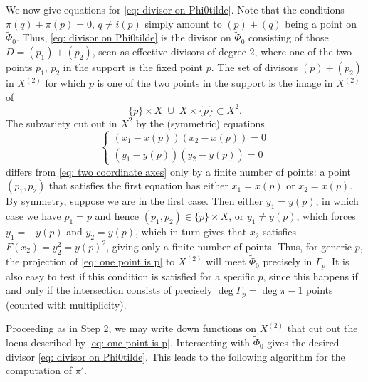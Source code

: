 \documentclass[a4paper,twoside,english]{amsart}
\theoremstyle{plain}
\theoremstyle{definition}
\begin{document}
We now give equations for \eqref{eq: divisor on Phi0tilde}. Note that the conditions $\pi(q) + \pi(p)=0,\, q \neq i(p)$ simply amount to $(p)+(q)$ being a point on $\tilde{\Phi}_0$. Thus, \eqref{eq: divisor on Phi0tilde} is the divisor on $\tilde{\Phi}_0$ consisting of those $D = (p_1)+(p_2)$, seen as effective divisors of degree $2$, where one of the two points $p_1,\,  p_2$ in the support is the fixed point $p$. The set of divisors $(p)+(p_2)$ in $X^{(2)}$ for which $p$ is one of the two points in the support is the image in $X^{(2)}$ of
\begin{equation}\label{eq: two coordinate axes}
    \{p\} \times X \; \cup \; X \times \{p\} \subset X^2.
\end{equation}
The subvariety cut out in $X^2$ by the (symmetric) equations
\begin{equation}\label{eq: one point is p}
\begin{cases}
(x_1 - x(p)) (x_2 - x(p)) =0 \\ (y_1 -y(p))(y_2 -y(p))=0 %
\end{cases}
\end{equation}
differs from \eqref{eq: two coordinate axes} only by a finite number of points: a point $(p_1, p_2)$ that satisfies the first equation has either $x_1=x(p)$ or $x_2=x(p)$. By symmetry, suppose we are in the first case. Then either $y_1 = y(p)$, in which case we have $p_1=p$ and hence $(p_1, p_2) \in \{p\} \times X$, or $y_1 \neq y(p)$, which forces $y_1=-y(p)$ and $y_2=y(p)$, which in turn gives that $x_2$ satisfies $F(x_2) = y_2^2 = y(p)^2$, giving only a finite number of points. Thus, for generic $p$, the projection of \eqref{eq: one point is p} to $X^{(2)}$ will meet $\tilde{\Phi}_0$ precisely in $\Gamma_p$. It is also easy to test if this condition is satisfied for a specific $p$, since this happens if and only if the intersection consists of precisely $\deg \Gamma_p = \deg \pi - 1$ points (counted with multiplicity).

Proceeding as in Step 2, we may write down functions on $X^{(2)}$ that cut out the locus described by \eqref{eq: one point is p}. Intersecting with $\tilde{\Phi}_0$ gives the desired divisor \eqref{eq: divisor on Phi0tilde}. This leads to the following algorithm for the computation of $\pi'$.
\end{document}
